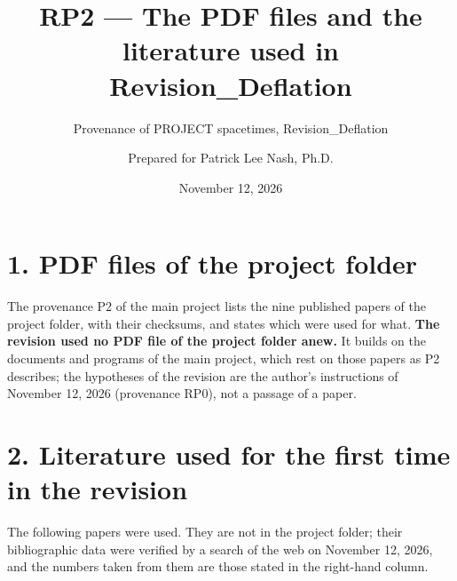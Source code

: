 \documentclass[
  10pt,
]{article}
\title{RP2 --- The PDF files and the literature used in
Revision\_Deflation}
\subtitle{Provenance of PROJECT spacetimes, Revision\_Deflation}
\author{Prepared for Patrick Lee Nash, Ph.D.}
\date{November 12, 2026}
\begin{document}
\maketitle

\hypertarget{pdf-files-of-the-project-folder}{%
\section{1. PDF files of the project
folder}\label{pdf-files-of-the-project-folder}}

The provenance P2 of the main project lists the nine published papers of
the project folder, with their checksums, and states which were used for
what. \textbf{The revision used no PDF file of the project folder anew.}
It builds on the documents and programs of the main project, which rest
on those papers as P2 describes; the hypotheses of the revision are the
author's instructions of November 12, 2026 (provenance RP0), not a
passage of a paper.

\hypertarget{literature-used-for-the-first-time-in-the-revision}{%
\section{2. Literature used for the first time in the
revision}\label{literature-used-for-the-first-time-in-the-revision}}

The following papers were used. They are not in the project folder;
their bibliographic data were verified by a search of the web on
November 12, 2026, and the numbers taken from them are those stated in
the right-hand column.
\end{document}

